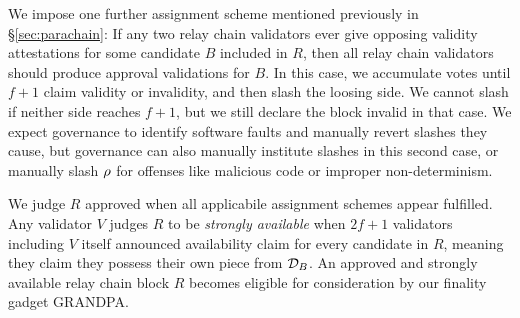 We impose one further assignment scheme mentioned previously in \S\ref{sec:parachain}:  If any two relay chain validators ever give opposing validity attestations for some candidate $B$ included in $R$, then all relay chain validators should produce approval validations for $B$.  In this case, we accumulate votes until $f+1$ claim validity or invalidity, and then slash the loosing side.  We cannot slash if neither side reaches $f+1$, but we still declare the block invalid in that case.  We expect governance to identify software faults and manually revert slashes they cause, but governance can also manually institute slashes in this second case, or manually slash $\rho$ for offenses like malicious code or improper non-determinism. 

We judge $R$ approved when all applicabile assignment schemes appear fulfilled.  Any validator $V$ judges $R$ to be {\em strongly available} when $2f+1$ validators including $V$ itself announced availability claim for every candidate in $R$, meaning they claim they possess their own piece from $\mathcal{D}_B$.  An approved and strongly available relay chain block $R$ becomes eligible for consideration by our finality gadget GRANDPA.


